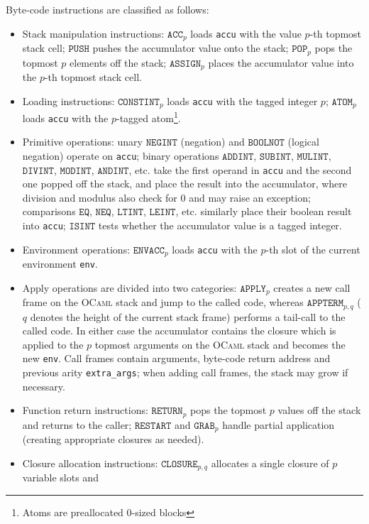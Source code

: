 \documentclass[a4paper]{acm_proc_article-sp}
\begin{document}
Byte-code instructions are classified as follows:
\begin{itemize}
\item Stack manipulation instructions: $\mathtt{ACC}_p$ loads \texttt{accu} with the value $p$-th topmost stack
  cell; $\mathtt{PUSH}$ pushes the accumulator value onto the stack; $\mathtt{POP}_p$ pops the topmost $p$ elements
  off the stack; $\mathtt{ASSIGN}_p$ places the accumulator value into the $p$-th topmost stack cell.
\item Loading instructions: $\mathtt{CONSTINT}_p$ loads \texttt{accu} with the tagged integer $p$;
  $\mathtt{ATOM}_p$ loads \texttt{accu} with the $p$-tagged atom\footnote{Atoms are preallocated $0$-sized
    blocks}.
\item Primitive operations: unary $\mathtt{NEGINT}$ (negation) and $\mathtt{BOOLNOT}$ (logical negation)
  operate on \texttt{accu}; binary operations $\mathtt{ADDINT}$, $\mathtt{SUBINT}$, $\mathtt{MULINT}$,
  $\mathtt{DIVINT}$, $\mathtt{MODINT}$, $\mathtt{ANDINT}$, etc. take the first operand in \texttt{accu}
  and the second one popped off the stack, and place the result into the accumulator, where division and
  modulus also check for $0$ and may raise an exception; comparisons $\mathtt{EQ}$, $\mathtt{NEQ}$,
  $\mathtt{LTINT}$, $\mathtt{LEINT}$, etc. similarly place their boolean result into \texttt{accu};
  $\texttt{ISINT}$ tests whether the accumulator value is a tagged integer.
\item Environment operations: $\mathtt{ENVACC}_p$ loads \texttt{accu} with the $p$-th slot of
  the current environment \texttt{env}.
\item Apply operations are divided into two categories: $\mathtt{APPLY}_p$ creates a new call frame on
  the \textsc{OCaml} stack and jump to the called code, whereas $\mathtt{APPTERM}_{p,q}$ ($q$ denotes the
  height of the current stack frame) performs a tail-call to the called code. In either case the accumulator
  contains the closure which is applied to the $p$ topmost arguments on the \textsc{OCaml} stack and becomes
  the new \texttt{env}. Call frames contain arguments, byte-code return address and previous arity
  \texttt{extra\_args}; when adding call frames, the stack may grow if necessary.
\item Function return instructions: $\mathtt{RETURN}_p$ pops the topmost $p$ values off the stack and
  returns to the caller; $\mathtt{RESTART}$ and $\mathtt{GRAB}_p$ handle partial application (creating
  appropriate closures as needed).
\item Closure allocation instructions: $\mathtt{CLOSURE}_{p,q}$ allocates a single closure of $p$ variable slots and

\end{itemize}
\end{document}
